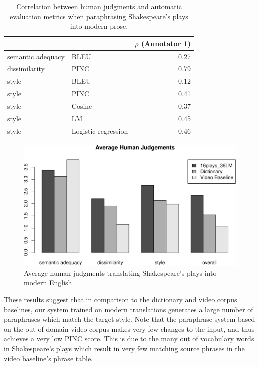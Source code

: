\documentclass[10pt,a5paper,twoside]{article}
\begin{document}
\begin{table}
  \begin{center}
  \begin{tabular}{|l|l|r|}
    \hline
    & & $\rho$ (Annotator 1) \\
    \hline
    \hline
    semantic adequacy & BLEU & 0.27 \\
    \hline
    dissimilarity & PINC & 0.79 \\
    \hline
    style & BLEU & 0.12 \\
    \hline
    style & PINC & 0.41 \\
    \hline
    style & Cosine & 0.37 \\
    \hline
    style & LM & 0.45 \\
    \hline
    style & Logistic regression & 0.46 \\
    \hline
  \end{tabular}
  \end{center}
  \caption{Correlation between human judgments and automatic evaluation metrics when paraphrasing Shakespeare's plays into modern prose.}
  \label{correlation_s2m}
\end{table}

\begin{figure}[ht]
  \begin{center}
    \includegraphics[width=5in]{figures/human_judgements_s2m-crop.pdf}
  \end{center}
  \caption{Average human judgments translating Shakespeare's plays into modern English.} 
  \label{human_judgements_s2m}
\end{figure}

These results suggest that in comparison to the dictionary and video corpus baselines, 
our system trained on modern translations generates a large number of paraphrases which match the target style.
Note that the paraphrase system 
based on the out-of-domain video corpus makes very few changes to the input, and thus achieves a very low PINC score.  This is due to the many out of
vocabulary words in Shakespeare's plays which result in very few matching source phrases in the video baseline's phrase table.
\end{document}
